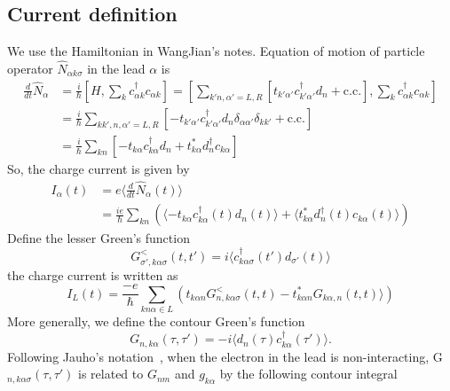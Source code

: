 \documentclass[aps,prb,superscriptaddress]{revtex4-2}
\begin{document}
\subsection{Current definition}
We use the Hamiltonian in WangJian's notes. Equation of motion of particle operator $\hat{N}_{\alpha k\sigma}$ in the lead $\alpha$ is
\begin{equation}
\begin{split}
\frac{d}{dt}\hat{N}_{\alpha} &= \frac{i}{\hbar}[H, \sum_{k}c_{\alpha k}^{\dag}c_{\alpha k}] = \left[\sum_{k'n, \alpha'=L, R}\left[t_{k' \alpha'} c_{k' \alpha'}^{\dag} d_{n}+\mathrm{c.c.}\right], \sum_{k}c_{\alpha k}^{\dag}c_{\alpha k}\right]\\
&=\frac{i}{\hbar}\sum_{kk',n, \alpha'=L, R}\left[ -t_{k' \alpha'} c_{k' \alpha' }^{\dag} d_{n}\delta_{\alpha\alpha'}\delta_{kk'}+\mathrm{c.c.}\right]\\
&=\frac{i}{\hbar}\sum_{kn}[-t_{k \alpha} c_{k \alpha}^{\dag} d_{n} + t_{k \alpha}^{*} d_{n}^{\dag}c_{k \alpha}]
\end{split}
\end{equation}
So, the charge current is given by
\begin{equation}
\begin{split}
I_{\alpha}(t) &= e\langle\frac{d}{dt}\hat{N}_{\alpha}(t)\rangle \\
&=\frac{ie}{\hbar}\sum_{kn}(\langle -t_{k \alpha} c_{k \alpha}^{\dag}(t) d_{n}(t)\rangle + \langle t_{k \alpha}^{*} d_{n}^{\dag}(t)c_{k \alpha}(t)\rangle)
\end{split}
\end{equation}
Define the lesser Green's function
\begin{equation}
G_{\sigma',k\alpha\sigma}^{<}(t,t') = i\langle c_{k\alpha\sigma}^{\dag}(t') d_{\sigma'}(t)\rangle 
\end{equation}
the charge current is written as
\begin{equation}
I_{L}(t)=\frac{-e}{\hbar}\sum_{kn\alpha\in L}(t_{k\alpha n}G_{n,k\alpha\sigma}^{<}(t,t) - t_{k \alpha n}^{*} G_{k\alpha,n}(t,t)\rangle)
\end{equation}
More generally, we define the contour Green's function
\begin{equation}
G_{n,k\alpha}(\tau,\tau') = -i\langle  d_{n}(\tau) c_{k\alpha}^{\dag}(\tau')\rangle .
\end{equation}
Following Jauho's notation~\cite{Jauho}, when the electron in the lead is non-interacting, G$_{n,k\alpha\sigma}(\tau,\tau')$ is related to $G_{nm}$ and $g_{k\alpha}$ by the following contour integral
\end{document}
